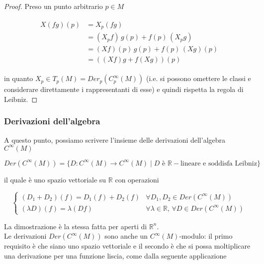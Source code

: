\begin{proof}
	Preso un punto arbitrario $ p \in M $
	
	\begin{align}
		\begin{split}
			X(f g)(p) &= X_{p}(f g)\\
			&= (X_{p} f) \, g(p) + f(p) \, (X_{p} g)\\
			&= (X f)(p) \, g(p) + f(p) \, (X g)(p)\\
			&= ((X f) g + f (X g))(p)
		\end{split}
	\end{align}
	
	in quanto $ X_{p} \in T_{p}(M) = Der_{p}(C_{p}^{\infty}(M)) $ (i.e. si possono omettere le classi e considerare direttamente i rappresentanti di esse) e quindi rispetta la regola di Leibniz.
\end{proof}

\subsubsection{Derivazioni dell'algebra}

A questo punto, possiamo scrivere l'insieme delle derivazioni dell'algebra $ C^{\infty}(M) $

\begin{equation}
	Der(C^{\infty}(M)) = \{ D : C^{\infty}(M) \to C^{\infty}(M) \mid D \text{ è } \mathbb{R}-\text{lineare e soddisfa Leibniz} \}
\end{equation}

il quale è uno spazio vettoriale su $ \mathbb{R} $ con operazioni

\begin{equation}
	\begin{cases}
		(D_{1} + D_{2})(f) = D_{1}(f) + D_{2}(f) & \forall D_{1},D_{2} \in Der(C^{\infty}(M))\\
		(\lambda D)(f) = \lambda (D f) & \forall \lambda \in \mathbb{R}, \, \forall D \in Der(C^{\infty}(M))
	\end{cases}
\end{equation}

La dimostrazione è la stessa fatta per aperti di $ \mathbb{R}^{n} $.\\
Le derivazioni $ Der(C^{\infty}(M)) $ sono anche un $ C^{\infty}(M) $-modulo: il primo requisito è che siano uno spazio vettoriale e il secondo è che si possa moltiplicare una derivazione per una funzione liscia, come dalla seguente applicazione

